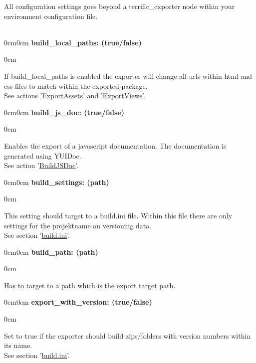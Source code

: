 
\newcommand{\optiondesc}[2]{
	\begin{adjustwidth}{0cm}{0cm}
		\noindent \textbf{#1}\\
		\vspace{-1em}
		\begin{adjustwidth}{\parindent}{0cm}
			#2
		\end{adjustwidth}
	\end{adjustwidth}
}

All configuration settings goes beyond a terrific\_exporter node within your environment configuration file.\\
\\
\optiondesc{build\_local\_paths: (true/false)}{
	If build\_local\_paths is enabled the exporter will change all urls within html and css files to match within the exported package.
	\\See actions '\hyperlink{sec-Actions-ExportAssets}{ExportAssets}' and '\hyperlink{sec-Actions-ExportViews}{ExportViews}'.\\
}

\optiondesc{build\_js\_doc: (true/false)}{
	Enables the export of a javascript documentation. The documentation is generated using YUIDoc.
	\\See action '\hyperlink{sec-Actions-BuildJSDoc}{BuildJSDoc}'.\\
}

\optiondesc{build\_settings: (path)}{
	This setting should target to a build.ini file. Within this file there are only settings for the projektname an versioning data.
	\\See section '\hyperlink{sec-build.ini}{build.ini}'.\\
}

\optiondesc{build\_path: (path)}{
	Has to target to a path which is the export target path.\\
}

\optiondesc{export\_with\_version: (true/false)}{
	Set to true if the exporter should build zips/folders with version numbers within its name.
	\\See section '\hyperlink{sec-build.ini}{build.ini}'.\\
}

